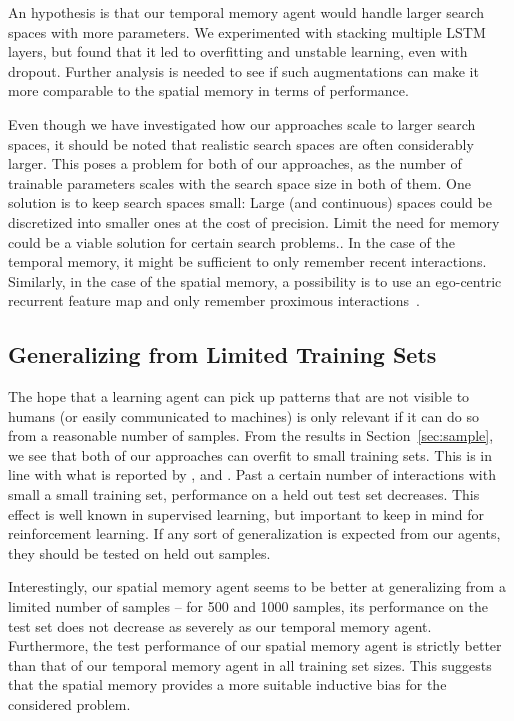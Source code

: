 An hypothesis is that our temporal memory agent would handle larger search spaces with more parameters.
We experimented with stacking multiple LSTM layers, but found that it led to overfitting and unstable learning, even with dropout.
Further analysis is needed to see if such augmentations can make it more comparable to the spatial memory in terms of performance.

Even though we have investigated how our approaches scale to larger search spaces,
it should be noted that realistic search spaces are often considerably larger.
This poses a problem for both of our approaches, as the number of trainable parameters scales with the search space size in both of them.
One solution is to keep search spaces small:
Large (and continuous) spaces could be discretized into smaller ones at the cost of precision.
Limit the need for memory could be a viable solution for certain search problems..
In the case of the temporal memory, it might be sufficient to only remember recent interactions.
Similarly, in the case of the spatial memory, a possibility is to use an ego-centric recurrent feature map and only remember proximous interactions~\cite{parisotto_neural_2017}.

\subsection{Generalizing from Limited Training Sets}

The hope that a learning agent can pick up patterns that are not visible to humans (or easily communicated to machines) is only relevant if it can do so from a reasonable number of samples.
From the results in Section~\ref{sec:sample}, we see that both of our approaches can overfit to small training sets.
This is in line with what is reported by \cite{cobbe_quantifying_2019}, \cite{cobbe_leveraging_2020} and \cite{zhang_study_2018}.
Past a certain number of interactions with small a small training set, performance on a held out test set decreases.
This effect is well known in supervised learning, but important to keep in mind for reinforcement learning.
If any sort of generalization is expected from our agents, they should be tested on held out samples.

Interestingly, our spatial memory agent seems to be better at generalizing from a limited number of samples --
for 500 and 1000 samples, its performance on the test set does not decrease as severely as our temporal memory agent.
Furthermore, the test performance of our spatial memory agent is strictly better than that of our temporal memory agent in all training set sizes.
This suggests that the spatial memory provides a more suitable inductive bias for the considered problem.

